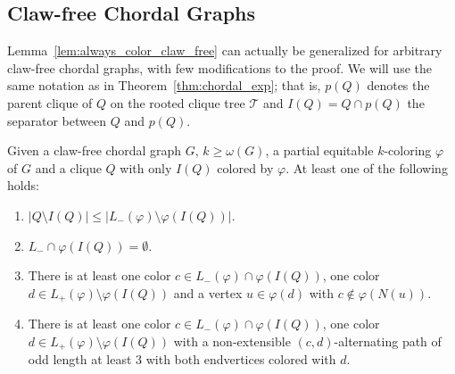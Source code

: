 \subsection{Claw-free Chordal Graphs}

Lemma~\ref{lem:always_color_claw_free} can actually be generalized for arbitrary claw-free chordal graphs, with few modifications to the proof.
We will use the same notation as in Theorem~\ref{thm:chordal_exp}; that is, $p(Q)$ denotes the parent clique of $Q$ on the rooted clique tree $\mathcal{T}$ and $I(Q) = Q \cap p(Q)$ the separator between $Q$ and $p(Q)$.

\begin{lemma}
    \label{lem:always_color_claw_free2}
    Given a claw-free chordal graph $G$, $k \geq \omega(G)$, a partial equitable $k$-coloring $\varphi$ of $G$ and a clique $Q$ with only $I(Q)$ colored by $\varphi$.
    At least one of the following holds:
    \begin{enumerate}
        \item $|Q \setminus I(Q)| \leq |L_-(\varphi) \setminus \varphi(I(Q))|$.
        \item $L_- \cap \varphi(I(Q)) = \emptyset$.
        \item There is at least one color $c \in L_-(\varphi) \cap \varphi(I(Q))$, one color $d \in L_+(\varphi) \setminus \varphi(I(Q))$ and a vertex $u \in \varphi(d)$ with $c \notin \varphi(N(u))$.
        \item There is at least one color $c \in L_-(\varphi) \cap \varphi(I(Q))$, one color $d \in L_+(\varphi) \setminus \varphi(I(Q))$ with a non-extensible $(c,d)$-alternating path of odd length at least 3 with both endvertices colored with $d$.
    \end{enumerate}
\end{lemma}


